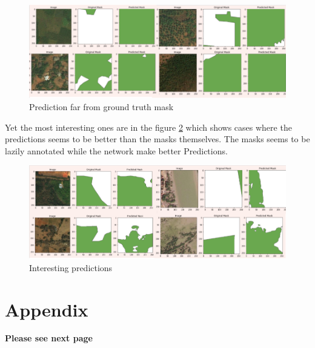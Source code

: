\documentclass[rnd]{mas_proposal}
\begin{document}
\begin{figure}[htp] 
        \centering
        \includegraphics[width=1.2\textwidth]{images/fig16_worse_pred.png}
        \caption{Prediction far from ground truth mask}%
        \label{fig:worse_pred}%
\end{figure}

\vspace{20px}

Yet the most interesting ones are in the figure \ref{fig:interest_pred} which shows cases where the predictions seems to be better than the masks 
themselves. The masks seems to be lazily annotated while the network make better Predictions.

\begin{figure}[htp] 
        \centering
        \includegraphics[width=1.2\textwidth]{images/fig17_interesting.png}
        \caption{Interesting predictions}%
        \label{fig:interest_pred}%
\end{figure}

\newpage
 

\newpage
\section{Appendix}


\textbf{Please see next page}



 
\end{document}
